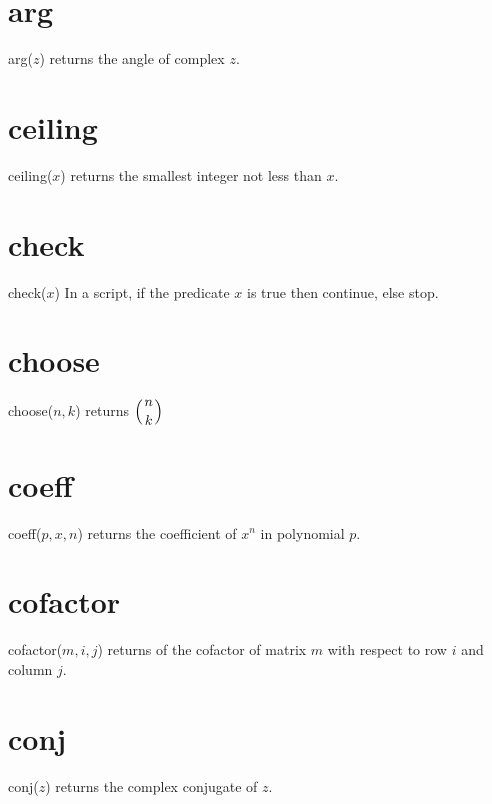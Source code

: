 \documentclass[12pt,openany]{report}
\begin{document}
\section*{arg}
arg($z$) returns the angle of complex $z$.

\section*{ceiling}
ceiling($x$) returns the smallest integer not less than $x$.

\section*{check}
check($x$) In a script, if the predicate $x$ is true then continue, else stop.

\section*{choose}
choose($n,k$) returns $\displaystyle\left({n \atop k}\right)$

\section*{coeff}
coeff($p,x,n$) returns the coefficient of $x^n$ in polynomial $p$.

\section*{cofactor}
cofactor($m,i,j$) returns of the cofactor of matrix $m$ with respect to row $i$ and column $j$.

\section*{conj}
conj($z$) returns the complex conjugate of $z$.
\end{document}
